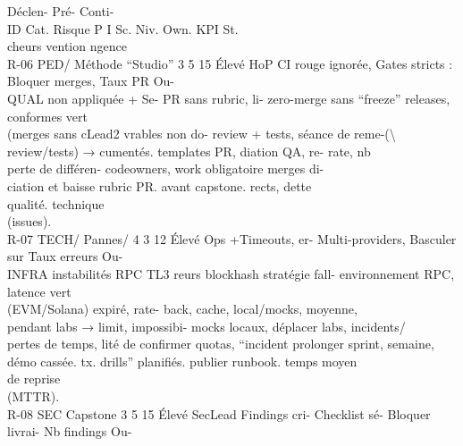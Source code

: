 \documentclass[12pt,landscape,a4paper]{article}
\begin{document}
\vspace{0.5em}
Déclen-           Pré-              Conti-\\
ID         Cat.     Risque            P I Sc. Niv. Own.                                                             KPI           St.\\
cheurs            vention           ngence\\
R-06       PED/     Méthode “Studio” 3 5 15 Élevé HoP      CI rouge ignorée, Gates stricts : Bloquer merges, Taux            PR Ou-\\
QUAL     non      appliquée            +    Se- PR sans rubric, li- zero-merge sans “freeze” releases, conformes      vert\\
(merges       sans            cLead2 vrables non do- review + tests, séance de reme-(\textbackslash{}%
review/tests) →                        cumentés.           templates   PR, diation QA, re- rate,         nb\\
perte de différen-                                         codeowners,     work obligatoire merges       di-\\
ciation et baisse                                          rubric PR.      avant capstone. rects,      dette\\
qualité.                                                                                      technique\\
(issues).\\
R-07       TECH/    Pannes/          4 3 12 Élevé Ops       +Timeouts,       er- Multi-providers, Basculer         sur Taux erreurs Ou-\\
INFRA    instabilités RPC              TL3        reurs blockhash stratégie          fall- environnement RPC, latence vert\\
(EVM/Solana)                             expiré,       rate- back,       cache, local/mocks,       moyenne,\\
pendant labs →                           limit, impossibi- mocks        locaux, déplacer     labs, incidents/\\
pertes de temps,                         lité de confirmer quotas, “incident prolonger sprint, semaine,\\
démo cassée.                             tx.                 drills” planifiés. publier runbook. temps moyen\\
de     reprise\\
(MTTR).\\
R-08       SEC      Capstone          3 5 15 Élevé SecLead Findings     cri- Checklist      sé- Bloquer    livrai- Nb findings Ou-\\
\end{document}
